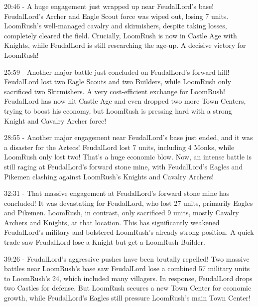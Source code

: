 20:46 - A huge engagement just wrapped up near FeudalLord's base! FeudalLord's Archer and Eagle Scout force was wiped out, losing 7 units. LoomRush's well-managed cavalry and skirmishers, despite taking losses, completely cleared the field. Crucially, LoomRush is now in Castle Age with Knights, while FeudalLord is still researching the age-up. A decisive victory for LoomRush! \par \vspace{1em}

25:59 - Another major battle just concluded on FeudalLord's forward hill! FeudalLord lost two Eagle Scouts and two Builders, while LoomRush only sacrificed two Skirmishers. A very cost-efficient exchange for LoomRush! FeudalLord has now hit Castle Age and even dropped two more Town Centers, trying to boost his economy, but LoomRush is pressing hard with a strong Knight and Cavalry Archer force! \par \vspace{1em}

28:55 - Another major engagement near FeudalLord's base just ended, and it was a disaster for the Aztecs! FeudalLord lost 7 units, including 4 Monks, while LoomRush only lost two! That's a huge economic blow. Now, an intense battle is still raging at FeudalLord's forward stone mine, with FeudalLord's Eagles and Pikemen clashing against LoomRush's Knights and Cavalry Archers! \par \vspace{1em}

32:31 - That massive engagement at FeudalLord's forward stone mine has concluded! It was devastating for FeudalLord, who lost 27 units, primarily Eagles and Pikemen. LoomRush, in contrast, only sacrificed 9 units, mostly Cavalry Archers and Knights, at that location. This has significantly weakened FeudalLord's military and bolstered LoomRush's already strong position. A quick trade saw FeudalLord lose a Knight but get a LoomRush Builder. \par \vspace{1em}

39:26 - FeudalLord's aggressive pushes have been brutally repelled! Two massive battles near LoomRush's base saw FeudalLord lose a combined 57 military units to LoomRush's 24, which included many villagers. In response, FeudalLord drops two Castles for defense. But LoomRush secures a new Town Center for economic growth, while FeudalLord's Eagles still pressure LoomRush's main Town Center! \par \vspace{1em}

